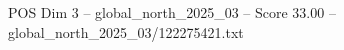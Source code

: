 \begin{textsample}{POS Dim 3 – global\_north\_2025\_03 – Score 33.00 – global\_north\_2025\_03/122275421.txt}
\end{textsample}
